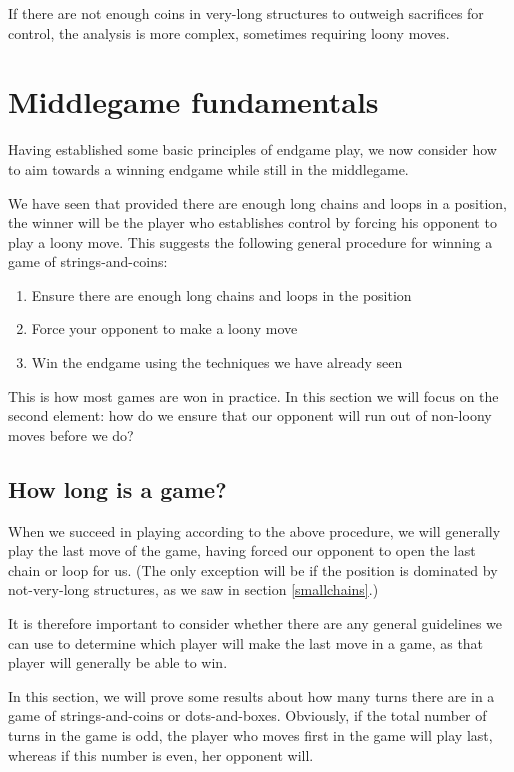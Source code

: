 \documentclass[a4paper,twocolumn]{article}
\begin{document}
If there are not enough coins in very-long structures to outweigh
sacrifices for control, the analysis is more complex, sometimes
requiring loony moves.

\section{Middlegame fundamentals}

Having established some basic principles of endgame play, we now
consider how to aim towards a winning endgame while still in the
middlegame.

We have seen that provided there are enough long chains and loops in 
a position, the winner will be the player who establishes control by 
forcing his opponent to play a loony move. This suggests the following
general procedure for winning a game of strings-and-coins:

\begin{enumerate}
  \item Ensure there are enough long chains and loops in the position
  \item Force your opponent to make a loony move
  \item Win the endgame using the techniques we have already seen
\end{enumerate}

This is how most games are won in practice. In this section we will focus
on the second element: how do we ensure that our opponent will run out of
non-loony moves before we do?

\subsection{How long is a game?}

When we succeed in playing according to the above procedure, we will 
generally play the last move of the game, having forced our opponent to
open the last chain or loop for us. (The only exception will be if the
position is dominated by not-very-long structures, as we saw in section
\ref{smallchains}.)

It is therefore important to consider whether there are any general
guidelines we can use to determine which player will make the last
move in a game, as that player will generally be able to win.

In this section, we will prove some results about how many turns there
are in a game of strings-and-coins or dots-and-boxes. Obviously, if
the total number of turns in the game is odd, the player who moves
first in the game will play last, whereas if this number is even, her
opponent will.
\end{document}
